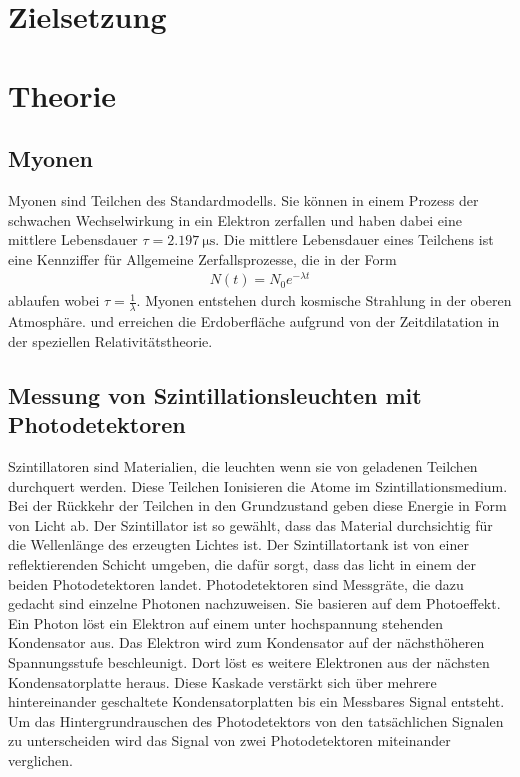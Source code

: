 \section{Zielsetzung}


\section{Theorie}
\subsection{Myonen}
Myonen sind Teilchen des Standardmodells.
Sie können in einem Prozess der schwachen Wechselwirkung in ein
Elektron zerfallen und haben dabei eine mittlere Lebensdauer
$\tau = \qty{2.197}{\micro\s}$\cite{PhysRev.132.2693}.
Die mittlere Lebensdauer eines Teilchens ist eine Kennziffer für
Allgemeine Zerfallsprozesse, die in der Form
\begin{align}
	N(t) = N_0 e^{-\lambda t}
\end{align}
ablaufen wobei $\tau = \frac{1}{\lambda}$.
Myonen entstehen durch kosmische Strahlung in der oberen Atmosphäre.
und erreichen die Erdoberfläche aufgrund von der Zeitdilatation in
der speziellen Relativitätstheorie.%


\subsection{Messung von Szintillationsleuchten mit Photodetektoren \cite{book:kolano}}

Szintillatoren sind Materialien, die leuchten wenn sie von geladenen Teilchen durchquert werden.
Diese Teilchen Ionisieren die Atome im Szintillationsmedium. Bei der Rückkehr der Teilchen in den
Grundzustand geben diese Energie in Form von Licht ab. Der Szintillator ist so gewählt, dass das
Material durchsichtig für die Wellenlänge des erzeugten Lichtes ist.
Der Szintillatortank ist von einer reflektierenden Schicht umgeben, die dafür sorgt, dass das licht in
einem der beiden Photodetektoren landet.
Photodetektoren sind Messgräte, die dazu gedacht sind einzelne Photonen nachzuweisen.
Sie basieren auf dem Photoeffekt. Ein Photon löst ein Elektron auf einem unter hochspannung stehenden Kondensator aus.
Das Elektron wird zum Kondensator auf der nächsthöheren Spannungsstufe beschleunigt. Dort löst es weitere Elektronen
aus der nächsten Kondensatorplatte heraus. Diese Kaskade verstärkt sich über mehrere hintereinander geschaltete Kondensatorplatten
bis ein Messbares Signal entsteht.
Um das Hintergrundrauschen des Photodetektors von den tatsächlichen Signalen zu unterscheiden wird das Signal von zwei Photodetektoren
miteinander verglichen.

